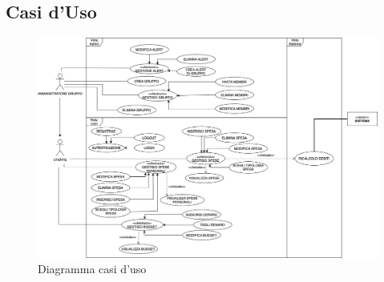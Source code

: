 \subsection{Casi d'Uso}

    \begin{figure}[h]
        \centering
        \includegraphics[width=1.1\textwidth, trim=3cm 0cm 1cm 0cm]{images/DiagrammaCasiDusoV1.1.png}
        \caption{Diagramma casi d'uso }
    \end{figure}

